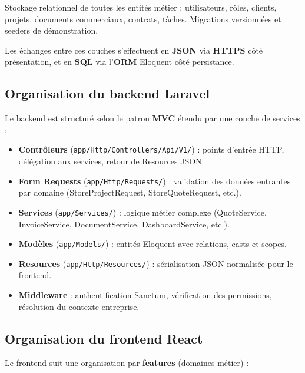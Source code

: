 \vspace{-0.2cm}

\begin{tcolorbox}[colback=ensamBlue!15, colframe=ensamBlue,
  title={\textbf{Couche Persistance} : MySQL / PostgreSQL + Eloquent ORM}, arc=3pt, boxrule=0.8pt]
Stockage relationnel de toutes les entités métier : utilisateurs, rôles, clients,
projets, documents commerciaux, contrats, tâches. Migrations versionnées et seeders
de démonstration.
\end{tcolorbox}

Les échanges entre ces couches s'effectuent en \textbf{JSON} via \textbf{HTTPS} côté
présentation, et en \textbf{SQL} via l'\textbf{ORM} Eloquent côté persistance.

\subsection{Organisation du backend Laravel}

Le backend est structuré selon le patron \textbf{MVC} étendu par une couche de services :

\begin{itemize}
  \item \textbf{Contrôleurs} (\texttt{app/Http/Controllers/Api/V1/}) : points d'entrée
  HTTP, délégation aux services, retour de Resources JSON.
  \item \textbf{Form Requests} (\texttt{app/Http/Requests/}) : validation des données
  entrantes par domaine (StoreProjectRequest, StoreQuoteRequest, etc.).
  \item \textbf{Services} (\texttt{app/Services/}) : logique métier complexe
  (QuoteService, InvoiceService, DocumentService, DashboardService, etc.).
  \item \textbf{Modèles} (\texttt{app/Models/}) : entités Eloquent avec relations,
  casts et scopes.
  \item \textbf{Resources} (\texttt{app/Http/Resources/}) : sérialisation JSON
  normalisée pour le frontend.
  \item \textbf{Middleware} : authentification Sanctum, vérification des permissions,
  résolution du contexte entreprise.
\end{itemize}

\subsection{Organisation du frontend React}

Le frontend suit une organisation par \textbf{features} (domaines métier) :

